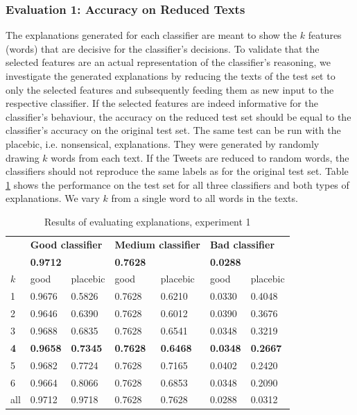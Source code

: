 \subsubsection{Evaluation 1: Accuracy on Reduced Texts}
The explanations generated for each classifier are meant to show the $k$ features (words) that are decisive for the classifier's decisions. To validate that the selected features are an actual representation of the classifier's reasoning, we investigate the generated explanations by reducing the texts of the test set to only the selected features and subsequently feeding them as new input to the respective classifier. If the selected features are indeed informative for the classifier's behaviour, the accuracy on the reduced test set should be equal to the classifier's accuracy on the original test set. The same test can be run with the placebic, i.e. nonsensical, explanations. They were generated by randomly drawing $k$ words from each text. If the Tweets are reduced to random words, the classifiers should not reproduce the same labels as for the original test set.\newline
Table \ref{tab:exp1} shows the performance on the test set for all three classifiers and both types of explanations. We vary $k$ from a single word to all words in the texts.\newline
\begin{table}[H]
	\centering
	\begin{tabular}{l|m{1.4cm}m{1.4cm}|m{1.4cm}m{1.4cm}|m{1.4cm}m{1.4cm}}
		& \multicolumn{2}{l|}{\textbf{Good classifier}} & \multicolumn{2}{l|}{\textbf{Medium classifier}} & \multicolumn{2}{l}{\textbf{Bad classifier}} \\ 
		& \multicolumn{2}{l|}{\textbf{0.9712}} & \multicolumn{2}{l|}{\textbf{0.7628}} & \multicolumn{2}{l}{\textbf{0.0288}} \\ \midrule
		$k$& good & placebic & good & placebic & good & placebic \\ \midrule
		1  &  0.9676  &  0.5826  & 0.7628 & 0.6210 & 0.0330  &  0.4048  \\
		2  &  0.9646  &  0.6390  & 0.7628 & 0.6012 & 0.0390  &  0.3676  \\
		3  &  0.9688  &  0.6835  & 0.7628 & 0.6541 & 0.0348  &  0.3219  \\
		\textbf{4}  &  \textbf{0.9658}  &  \textbf{0.7345}  & \textbf{0.7628} & \textbf{0.6468} & \textbf{0.0348}  &  \textbf{0.2667}  \\
		5  &  0.9682  &  0.7724  & 0.7628 & 0.7165 & 0.0402  &  0.2420  \\
		6  &  0.9664  &  0.8066  & 0.7628 &  0.6853 & 0.0348  &  0.2090  \\
		all  &  0.9712  &  0.9718  & 0.7628 & 0.7628 & 0.0288  &  0.0312  \\ \bottomrule
	\end{tabular}
	\caption{Results of evaluating explanations, experiment 1}
	\label{tab:exp1}
\end{table}
